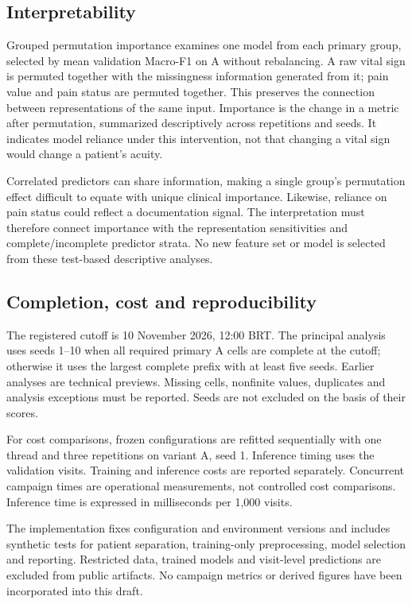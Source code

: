 \subsection{Interpretability}
Grouped permutation importance examines one model from each primary group,
selected by mean validation Macro-F1 on A without rebalancing. A raw vital sign
is permuted together with the missingness information generated from it;
pain value and pain status are permuted together. This preserves the
connection between representations of the same input. Importance is the
change in a metric after permutation, summarized descriptively across
repetitions and seeds. It indicates model reliance under this intervention,
not that changing a vital sign would change a patient's acuity.

Correlated predictors can share information, making a single group's
permutation effect difficult to equate with unique clinical importance.
Likewise, reliance on pain status could reflect a documentation signal.
The interpretation must therefore connect importance with the representation
sensitivities and complete/incomplete predictor strata. No new feature set
or model is selected from these test-based descriptive analyses.

\subsection{Completion, cost and reproducibility}
The registered cutoff is 10 November 2026, 12:00 BRT. The principal analysis
uses seeds 1--10 when all required primary A cells are complete at the cutoff;
otherwise it uses the largest complete prefix with at least five seeds.
Earlier analyses are technical previews. Missing cells, nonfinite values,
duplicates and analysis exceptions must be reported. Seeds are not excluded
on the basis of their scores.

For cost comparisons, frozen configurations are refitted sequentially with
one thread and three repetitions on variant A, seed 1. Inference timing
uses the validation visits.
Training and inference costs are reported separately. Concurrent campaign
times are operational measurements, not controlled cost comparisons.
Inference time is expressed in milliseconds per 1,000 visits.

The implementation fixes configuration and environment versions and includes
synthetic tests for patient separation, training-only preprocessing, model
selection and reporting. 
Restricted data, trained models and visit-level predictions are
excluded from public artifacts. No campaign metrics or derived figures have
been incorporated into this draft.

